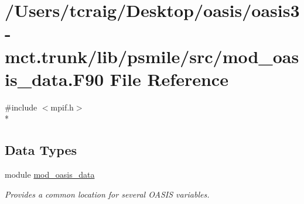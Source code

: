 \hypertarget{mod__oasis__data_8_f90}{\section{/\+Users/tcraig/\+Desktop/oasis/oasis3-\/mct.trunk/lib/psmile/src/mod\+\_\+oasis\+\_\+data.F90 File Reference}
\label{mod__oasis__data_8_f90}
}
{\ttfamily \#include $<$mpif.\+h$>$}\\*
\subsection*{Data Types}
\begin{DoxyCompactItemize}
\item 
module \hyperlink{classmod__oasis__data}{mod\+\_\+oasis\+\_\+data}
\begin{DoxyCompactList}\small\item\em Provides a common location for several O\+A\+S\+I\+S variables. \end{DoxyCompactList}\end{DoxyCompactItemize}
